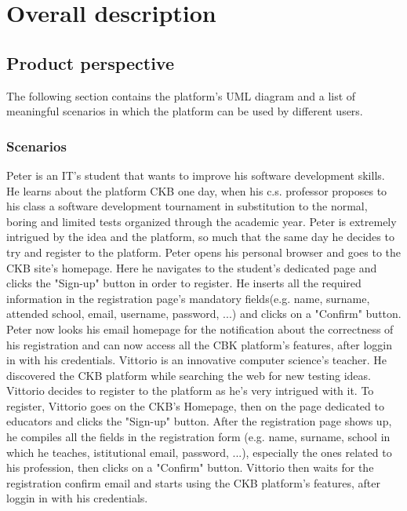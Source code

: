 \documentclass{article}
\newcounter{subsubsubsection}[subsubsection]
\begin{document}
{\newpage

\pagestyle{OverallDescriptionStyle}

\section{Overall description}
\subsection{Product perspective}
The following section contains the platform's UML diagram and a list of meaningful 
scenarios in which the platform can be used by different users.
\subsubsection{Scenarios}
Peter is an IT's student that wants to improve his software development skills. 
He learns about the platform CKB one day, when his c.s. professor proposes to his class a software development tournament 
in substitution to the normal, boring and limited tests organized through the academic year.
Peter is extremely intrigued by the idea and the platform, so much that the same day he decides to try and register to the platform.
Peter opens his personal browser and goes to the CKB site's homepage. Here he navigates to the student's dedicated page and clicks the 
"Sign-up" button in order to register. 
He inserts all the required information in the registration page's mandatory fields(e.g. name, surname, attended school, email, username, password, ...)
 and clicks on a "Confirm" button.
Peter now looks his email homepage for the notification about the correctness of his registration 
and can now access all the CBK platform's features, after loggin in with his credentials.
Vittorio is an innovative computer science's teacher. 
He discovered the CKB platform while searching the web for new testing ideas.
Vittorio decides to register to the platform as he's very intrigued with it. 
To register, Vittorio goes on the CKB's Homepage, then on the page dedicated to educators and clicks the "Sign-up" button.
 After the registration page shows up, he compiles all the fields in the registration form (e.g. name, surname, school in which he teaches, istitutional email, password, ...), 
 especially the ones related to his profession, then clicks on a "Confirm" button.
Vittorio then waits for the registration confirm email and starts using the CKB platform's features, after loggin in with his credentials.
}
\end{document}
